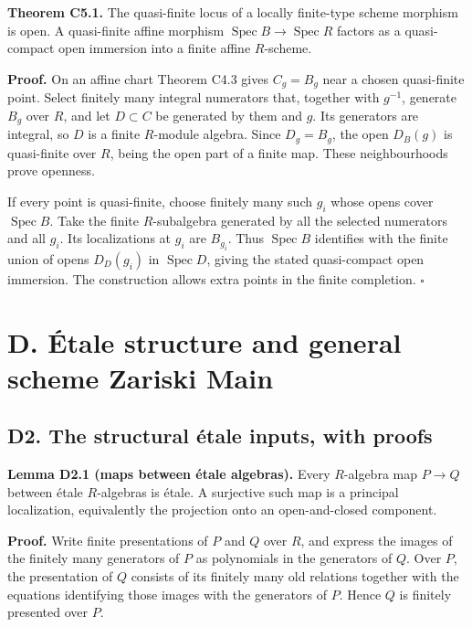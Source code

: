 \documentclass[11pt,a4paper,openany]{report}
\begin{document}
\textbf{Theorem C5.1.} The quasi-finite locus of a locally finite-type scheme morphism is open. A quasi-finite affine morphism \(\operatorname{Spec}B\to\operatorname{Spec}R\) factors as a quasi-compact open immersion into a finite affine \(R\)-scheme.

\textbf{Proof.} On an affine chart Theorem C4.3 gives \(C_g=B_g\) near a chosen quasi-finite point. Select finitely many integral numerators that, together with \(g^{-1}\), generate \(B_g\) over \(R\), and let \(D\subset C\) be generated by them and \(g\). Its generators are integral, so \(D\) is a finite \(R\)-module algebra. Since \(D_g=B_g\), the open \(D_B(g)\) is quasi-finite over \(R\), being the open part of a finite map. These neighbourhoods prove openness.

If every point is quasi-finite, choose finitely many such \(g_i\) whose opens cover \(\operatorname{Spec}B\). Take the finite \(R\)-subalgebra generated by all the selected numerators and all \(g_i\). Its localizations at \(g_i\) are \(B_{g_i}\). Thus \(\operatorname{Spec}B\) identifies with the finite union of opens \(D_D(g_i)\) in \(\operatorname{Spec}D\), giving the stated quasi-compact open immersion. The construction allows extra points in the finite completion. \(\square\)

\section{D. Étale structure and general scheme Zariski Main}\label{AG-RG-S04-d.-uxe9tale-structure-and-general-scheme-zariski-main}

\subsection{D2. The structural étale inputs, with proofs}\label{AG-RG-S04-d2.-the-structural-uxe9tale-inputs-with-proofs}

\textbf{Lemma D2.1 (maps between étale algebras).} Every \(R\)-algebra map \(P\to Q\) between étale \(R\)-algebras is étale. A surjective such map is a principal localization, equivalently the projection onto an open-and-closed component.

\textbf{Proof.} Write finite presentations of \(P\) and \(Q\) over \(R\), and express the images of the finitely many generators of \(P\) as polynomials in the generators of \(Q\). Over \(P\), the presentation of \(Q\) consists of its finitely many old relations together with the equations identifying those images with the generators of \(P\). Hence \(Q\) is finitely presented over \(P\).
\end{document}
